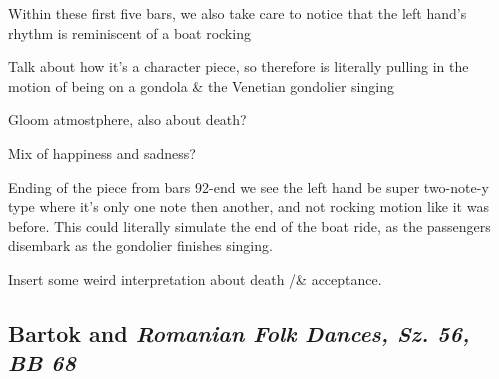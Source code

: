 Within these first five bars, we also take care to notice that the left hand's rhythm is reminiscent of a boat rocking

Talk about how it's a character piece, so therefore is literally pulling in the motion of being on a gondola \& the Venetian gondolier singing

Gloom atmostphere, also about death?

Mix of happiness and sadness?

Ending of the piece from bars 92-end we see the left hand be super two-note-y type where it's only one note then another, and not rocking motion like it was before. This could literally simulate the end of the boat ride, as the passengers disembark as the gondolier finishes singing.

Insert some weird interpretation about death /& acceptance.

\subsection*{Bartok and \textit{Romanian Folk Dances, Sz. 56, BB 68}}
